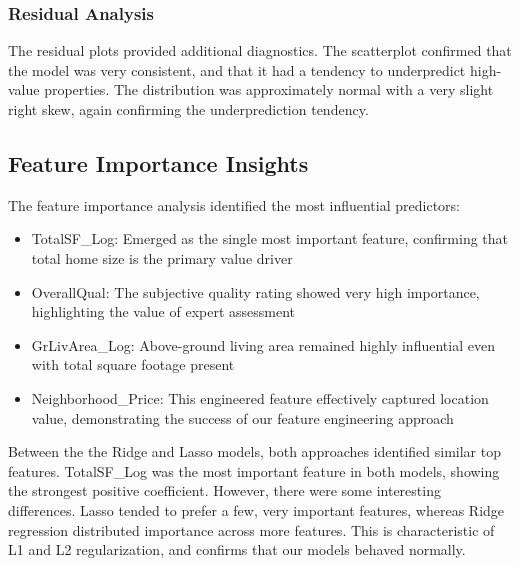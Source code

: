 \documentclass{article}
\begin{document}
\subsubsection{Residual Analysis}
The residual plots provided additional diagnostics. The scatterplot confirmed that the model was very consistent, and that it had a tendency to underpredict high-value properties. The distribution was approximately normal with a very slight right skew, again confirming the underprediction tendency.

\subsection{Feature Importance Insights}

The feature importance analysis identified the most influential predictors:
\begin{itemize}
    \item TotalSF\_Log: Emerged as the single most important feature, confirming that total home size is the primary value driver
    \item OverallQual: The subjective quality rating showed very high importance, highlighting the value of expert assessment
    \item GrLivArea\_Log: Above-ground living area remained highly influential even with total square footage present
    \item Neighborhood\_Price: This engineered feature effectively captured location value, demonstrating the success of our feature engineering approach
\end{itemize}

    Between the the Ridge and Lasso models, both approaches identified similar top features. TotalSF\_Log was the most important feature in both models, showing the strongest positive coefficient. However, there were some interesting differences. Lasso tended to prefer a few, very important features, whereas Ridge regression distributed importance across more features. This is characteristic of L1 and L2 regularization, and confirms that our models behaved normally.
\end{document}
